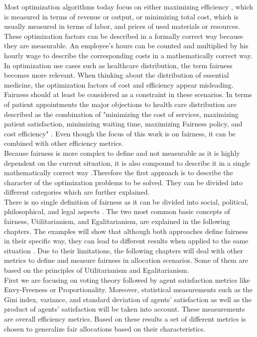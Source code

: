 \documentclass[german, a4paper, 11pt, oneside]{scrbook}
\begin{document}
Most optimization algorithms today focus on either maximizing efficiency \cite{Foulds.7222018}, which is measured in terms of revenue or output, or minimizing total cost, which is usually measured in terms of labor, and prices of used materials or resources. \cite{XinyingChen.2023, Hooker} These optimization factors can be described in a formally correct way because they are measurable. An employee's hours can be counted and multiplied by his hourly wage to describe the corresponding costs in a mathematically correct way. \\In optimization use cases such as healthcare distribution, the term fairness becomes more relevant. When thinking about the distribution of essential medicine, the optimization factors of cost and efficiency appear misleading. Fairness should at least be considered as a constraint in these scenarios. In terms of patient appointments the major objections to health care distribution are described as the combination of "minimizing the cost of services, maximizing patient satisfaction, minimizing waiting time, maximizing Fairness policy, and cost efficiency" \cite[p.2]{Ala.2021}. Even though the focus of this work is on fairness, it can be combined with other efficiency metrics.\\ Because fairness is more complex to define and not measurable as it is highly dependent on the current situation, it is also compound to describe it in a single mathematically correct way \cite{Binns.}.Therefore the first approach is to describe the character of the optimization problems to be solved. They can be divided into different categories which are further explained. \\ There is no single definition of fairness as it can be divided into social, political, philosophical, and legal aspects \cite{Foulds.7222018}. The two most common basic concepts of fairness, Utilitarianism, and Egalitarianism, are explained in the following chapters. The examples will show that although both approaches define fairness in their specific way, they can lead to different results when applied to the same situation \cite{Yu.7222022}. Due to their limitations, the following chapters will deal with other metrics to define and measure fairness in allocation scenarios. Some of them are based on the principles of Utilitarianism and Egalitarianism. \\ First we are focusing on voting theory followed by agent satisfaction metrics like Envy-Freeness or Proportionality. Moreover, statistical measurements such as the Gini index, variance, and standard deviation of agents' satisfaction as well as the product of agents' satisfaction will be taken into account. These measurements are overall efficiency metrics. Based on these results a set of different metrics is chosen to generalize fair allocations based on their characteristics.
\end{document}
